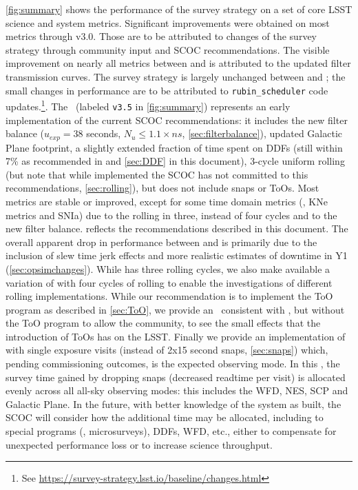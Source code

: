  \autoref{fig:summary} shows the performance of the survey strategy on a set of core LSST science and system metrics. Significant improvements were obtained on most metrics through v3.0. Those are to be attributed to changes of the survey strategy through community input and SCOC recommendations. The visible improvement on nearly all metrics between  and  is attributed to the updated filter transmission curves. The survey strategy is largely unchanged between  and ; the small changes in performance are to be attributed to  \texttt{rubin\_scheduler} code updates.\footnote{See \url{https://survey-strategy.lsst.io/baseline/changes.html}}. The  \opsim\ (labeled \texttt{v3.5} in \autoref{fig:summary}) represents an early implementation of the current SCOC recommendations: it includes the new filter balance ($u_{exp}=38$ seconds, $N_u \leq1.1\times ns$, \autoref{sec:filterbalance}), updated Galactic Plane footprint, a slightly extended fraction of time spent on DDFs (still within 7\% as recommended in  and \autoref{sec:DDF} in this document), 3-cycle uniform rolling (but note that while implemented the SCOC has not committed to this recommendations, \autoref{sec:rolling}), but does not include snaps or ToOs. Most metrics are stable or improved, except for some time domain metrics (\eg, KNe metrics and SNIa) due to the rolling in three, instead of four cycles and to the new filter balance.  reflects the recommendations described in this document. The overall apparent drop in performance between  and  is primarily due to the inclusion of slew time jerk effects and more realistic estimates of downtime in Y1 (\autoref{sec:opsimchanges}). While  has three rolling cycles, we also make available a variation of  with four cycles of rolling to enable the investigations of different rolling implementations. While our recommendation is to implement the ToO program as described in \autoref{sec:ToO}, we provide an \opsim\ consistent with , but without the ToO program to allow the community, to see the small effects that the introduction of ToOs has on the LSST. Finally we provide an implementation of  with single exposure visits (instead of 2x15 second snaps, \autoref{sec:snaps}) which, pending commissioning outcomes, is the expected observing mode. In this \opsim, the survey time gained by dropping snaps (decreased readtime per visit) is allocated evenly across all all-sky observing modes: this includes the WFD, NES, SCP and Galactic Plane. In the future, with better knowledge of the system as built, the SCOC will consider how the additional time may be allocated, including to special programs (\eg, microsurveys), DDFs, WFD, etc., either to compensate for unexpected performance loss or to increase science throughput.


